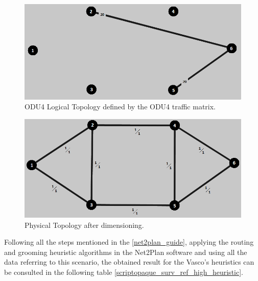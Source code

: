 \begin{figure}[H]
\centering
\includegraphics[width=13cm]{sdf/heuristic/opaque_survivability/high/logical_topology_odu4_high}
\caption{ODU4 Logical Topology defined by the ODU4 traffic matrix.}
\label{logical_ODU4_surv_ref_high_heuristic}
\end{figure}

\begin{figure}[H]
\centering
\includegraphics[width=13cm]{sdf/heuristic/opaque_survivability/high/physical_topology_high}
\caption{Physical Topology after dimensioning.}
\label{physical_topology_surv_ref_high_heuristic}
\end{figure}

Following all the steps mentioned in the \ref{net2plan_guide}, applying the routing and grooming heuristic algorithms in the Net2Plan software and using all the data referring to this scenario, the obtained result for the Vasco's heuristics can be consulted in the following table \ref{scriptopaque_surv_ref_high_heuristic}.

